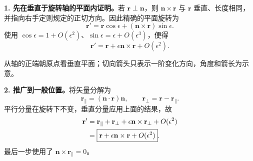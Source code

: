 \begin{checkedsolution}
\textbf{1. 先在垂直于旋转轴的平面内证明。}若 $\mathbf r\perp\mathbf n$，则 $\mathbf n\times\mathbf r$ 与 $\mathbf r$ 垂直、长度相同，并指向右手定则规定的正切方向。因此精确的平面旋转为
\begin{equation}
  \mathbf r'=\mathbf r\cos\epsilon
    +(\mathbf n\times\mathbf r)\sin\epsilon.
\end{equation}
使用 $\cos\epsilon=1+O(\epsilon^2)$、$\sin\epsilon=\epsilon+O(\epsilon^3)$，便得
\begin{equation}
  \boxed{\mathbf r'=\mathbf r+\epsilon\mathbf n\times\mathbf r
    +O(\epsilon^2).}
\end{equation}

\begin{center}

\small 从轴的正端朝原点看垂直平面；切向箭头只表示一阶变化方向，角度和箭长为示意。
\end{center}

\textbf{2. 推广到一般位置。}将矢量分解为
\begin{equation}
  \mathbf r_\parallel=(\mathbf n\cdot\mathbf r)\mathbf n,\qquad
  \mathbf r_\perp=\mathbf r-\mathbf r_\parallel.
\end{equation}
平行分量在旋转下不变，垂直分量应用上面的结果，故
\begin{align}
  \mathbf r'
  &=\mathbf r_\parallel+\mathbf r_\perp
    +\epsilon\mathbf n\times\mathbf r_\perp+O(\epsilon^2)\notag\\
  &=\boxed{\mathbf r+\epsilon\mathbf n\times\mathbf r+O(\epsilon^2)}.
\end{align}
最后一步使用了 $\mathbf n\times\mathbf r_\parallel=0$。


\end{checkedsolution}
